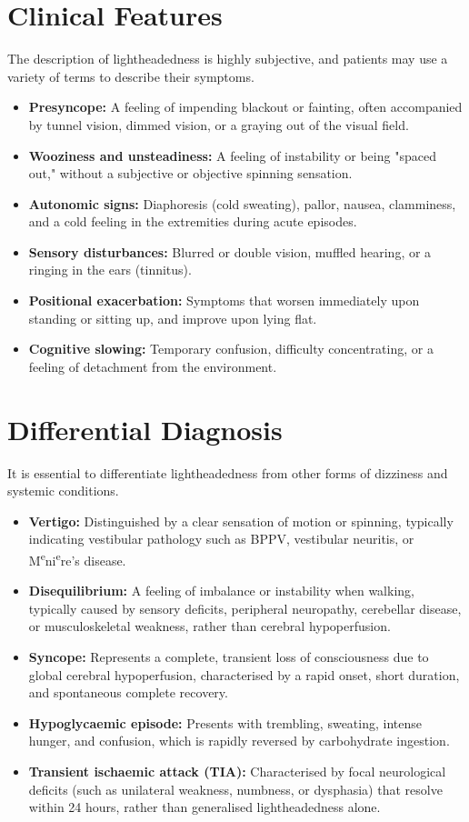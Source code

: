 \section*{Clinical Features}
The description of lightheadedness is highly subjective, and patients may use a variety of terms to describe their symptoms.
\begin{itemize}
    \item \textbf{Presyncope:} A feeling of impending blackout or fainting, often accompanied by tunnel vision, dimmed vision, or a graying out of the visual field.
    \item \textbf{Wooziness and unsteadiness:} A feeling of instability or being "spaced out," without a subjective or objective spinning sensation.
    \item \textbf{Autonomic signs:} Diaphoresis (cold sweating), pallor, nausea, clamminess, and a cold feeling in the extremities during acute episodes.
    \item \textbf{Sensory disturbances:} Blurred or double vision, muffled hearing, or a ringing in the ears (tinnitus).
    \item \textbf{Positional exacerbation:} Symptoms that worsen immediately upon standing or sitting up, and improve upon lying flat.
    \item \textbf{Cognitive slowing:} Temporary confusion, difficulty concentrating, or a feeling of detachment from the environment.
\end{itemize}

\section*{Differential Diagnosis}
It is essential to differentiate lightheadedness from other forms of dizziness and systemic conditions.
\begin{itemize}
    \item \textbf{Vertigo:} Distinguished by a clear sensation of motion or spinning, typically indicating vestibular pathology such as BPPV, vestibular neuritis, or M\textsuperscript{e}ni\textsuperscript{e}re's disease.
    \item \textbf{Disequilibrium:} A feeling of imbalance or instability when walking, typically caused by sensory deficits, peripheral neuropathy, cerebellar disease, or musculoskeletal weakness, rather than cerebral hypoperfusion.
    \item \textbf{Syncope:} Represents a complete, transient loss of consciousness due to global cerebral hypoperfusion, characterised by a rapid onset, short duration, and spontaneous complete recovery.
    \item \textbf{Hypoglycaemic episode:} Presents with trembling, sweating, intense hunger, and confusion, which is rapidly reversed by carbohydrate ingestion.
    \item \textbf{Transient ischaemic attack (TIA):} Characterised by focal neurological deficits (such as unilateral weakness, numbness, or dysphasia) that resolve within 24 hours, rather than generalised lightheadedness alone.
\end{itemize}

